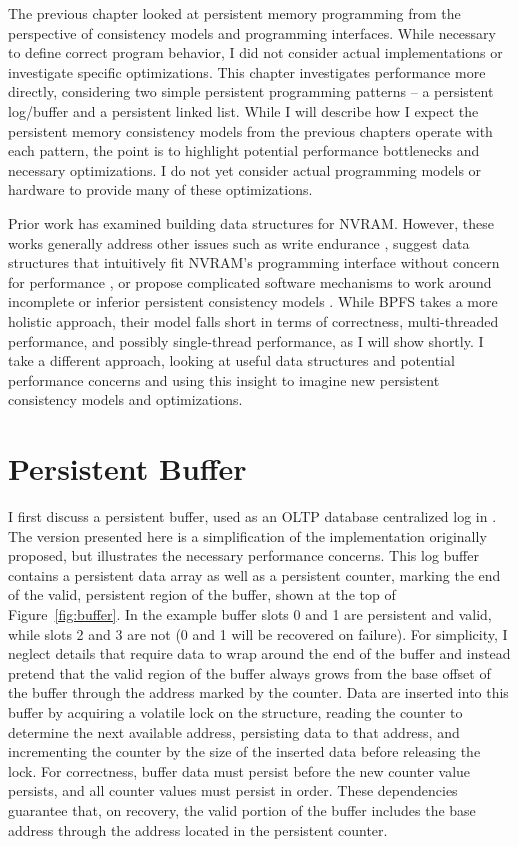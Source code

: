 The previous chapter looked at persistent memory programming from the perspective of consistency models and programming interfaces.
While necessary to define correct program behavior, I did not consider actual implementations or investigate specific optimizations.
This chapter investigates performance more directly, considering two simple persistent programming patterns -- a persistent log/buffer and a persistent linked list.
While I will describe how I expect the persistent memory consistency models from the previous chapters operate with each pattern, the point is to highlight potential performance bottlenecks and necessary optimizations.
I do not yet consider actual programming models or hardware to provide many of these optimizations.

Prior work has examined building data structures for NVRAM.
However, these works generally address other issues such as write endurance \cite{ChenGibbons11}, suggest data structures that intuitively fit NVRAM's programming interface without concern for performance \cite{VenkataramanTolia11}, or propose complicated software mechanisms to work around incomplete or inferior persistent consistency models \cite{FangHsiao11}.
While BPFS \cite{ConditNightingale09} takes a more holistic approach, their model falls short in terms of correctness, multi-threaded performance, and possibly single-thread performance, as I will show shortly.
I take a different approach, looking at useful data structures and potential performance concerns and using this insight to imagine new persistent consistency models and optimizations.

\section{Persistent Buffer}
\label{sec:PMC_patterns:Buffer}



I first discuss a persistent buffer, used as an OLTP database centralized log in \cite{FangHsiao11}.
The version presented here is a simplification of the implementation originally proposed, but illustrates the necessary performance concerns.
This log buffer contains a persistent data array as well as a persistent counter, marking the end of the valid, persistent region of the buffer, shown at the top of Figure~\ref{fig:buffer}.
In the example buffer slots 0 and 1 are persistent and valid, while slots 2 and 3 are not (0 and 1 will be recovered on failure).
For simplicity, I neglect details that require data to wrap around the end of the buffer and instead pretend that the valid region of the buffer always grows from the base offset of the buffer through the address marked by the counter.
Data are inserted into this buffer by acquiring a volatile lock on the structure, reading the counter to determine the next available address, persisting data to that address, and incrementing the counter by the size of the inserted data before releasing the lock.
For correctness, buffer data must persist before the new counter value persists, and all counter values must persist in order.
These dependencies guarantee that, on recovery, the valid portion of the buffer includes the base address through the address located in the persistent counter.

